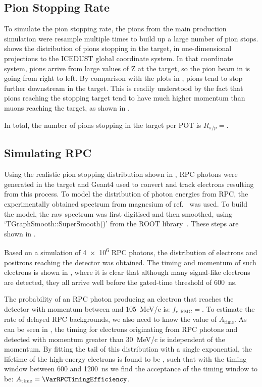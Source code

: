 \subsection{Pion Stopping Rate}
\FigPionStopDist
\FigPiVsMuMomenta
To simulate the pion stopping rate, the pions from the main production simulation were resample multiple times to build up a large number of pion stops.
 shows the distribution of pions stopping in the target, in one-dimensional projections to the ICEDUST global coordinate system.
In that coordinate system, pions arrive from large values of Z at the target, so the pion beam in  is going from right to left.
By comparison with the plots in , pions tend to stop further downstream in the target.
This is readily understood by the fact that pions reaching the stopping target tend to have much higher momentum than muons reaching the target, as shown in .

In total, the number of pions stopping in the target per \ac{POT} is $R_{\pi/p}=$\VarPiStopsPerPOT.

\subsection{Simulating \acs{RPC}}
\FigRPCSimulatedSpectrum
\FigRPCSimResults
Using the realistic pion stopping distribution shown in , \ac{RPC} photons were generated in the target and Geant4 used to convert and track electrons resulting from this process.
To model the distribution of photon energies from \ac{RPC}, the experimentally obtained spectrum from magnesium of ref.~\cite{Bistirlich:1972jy} was used.
To build the model, the raw spectrum was first digitised and then smoothed, using `TGraphSmooth::SuperSmooth()' from the  ROOT library~\cite{ROOT}.
These steps are shown in .

Based on a simulation of \num{4e6} RPC photons, the distribution of electrons and positrons reaching the detector was obtained.
The timing and momentum of such electrons is shown in , where it is clear that although many signal-like electrons are detected, they all arrive well before the gated-time threshold of 600~ns.

The probability of an \ac{RPC} photon producing an electron that reaches the detector with momentum between \VarMomThreshold and 105~MeV/c is: $f_{e,\textrm{RMC}}=$\VarDetectedEsPerRPC.
To estimate the rate of delayed \ac{RPC} backgrounds, we also need to know the value of $A_\textrm{time}$.
As can be seen in , the timing for electrons originating from RPC photons and detected with momentum greater than 30~MeV/c is independent of the momentum.
By fitting the tail of this distribution with a single exponential, the lifetime of the high-energy electrons is found to be \VarRPCLifetime, such that with the timing window between 600 and 1200~ns we find the acceptance of the timing window to be: $A_\textrm{time}=\VarRPCTimingEfficiency$.

